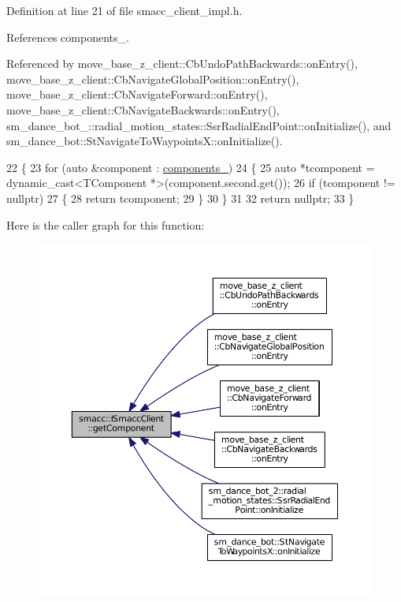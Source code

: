 Definition at line 21 of file smacc\+\_\+client\+\_\+impl.\+h.



References components\+\_\+.



Referenced by move\+\_\+base\+\_\+z\+\_\+client\+::\+Cb\+Undo\+Path\+Backwards\+::on\+Entry(), move\+\_\+base\+\_\+z\+\_\+client\+::\+Cb\+Navigate\+Global\+Position\+::on\+Entry(), move\+\_\+base\+\_\+z\+\_\+client\+::\+Cb\+Navigate\+Forward\+::on\+Entry(), move\+\_\+base\+\_\+z\+\_\+client\+::\+Cb\+Navigate\+Backwards\+::on\+Entry(), sm\+\_\+dance\+\_\+bot\+\_\+::radial\+\_\+motion\+\_\+states\+::\+Ssr\+Radial\+End\+Point\+::on\+Initialize(), and sm\+\_\+dance\+\_\+bot\+::\+St\+Navigate\+To\+Waypoints\+X\+::on\+Initialize().


\begin{DoxyCode}
22 \{
23     \textcolor{keywordflow}{for} (\textcolor{keyword}{auto} &component : \hyperlink{classsmacc_1_1ISmaccClient_ab983e85d296c9660f5943c1d511634ce}{components\_})
24     \{
25         \textcolor{keyword}{auto} *tcomponent = \textcolor{keyword}{dynamic\_cast<}TComponent *\textcolor{keyword}{>}(component.second.get());
26         \textcolor{keywordflow}{if} (tcomponent != \textcolor{keyword}{nullptr})
27         \{
28             \textcolor{keywordflow}{return} tcomponent;
29         \}
30     \}
31 
32     \textcolor{keywordflow}{return} \textcolor{keyword}{nullptr};
33 \}
\end{DoxyCode}


Here is the caller graph for this function\+:
\nopagebreak
\begin{figure}[H]
\begin{center}
\leavevmode
\includegraphics[width=350pt]{classsmacc_1_1ISmaccClient_adef78db601749ca63c19e74a27cb88cc_icgraph}
\end{center}
\end{figure}


